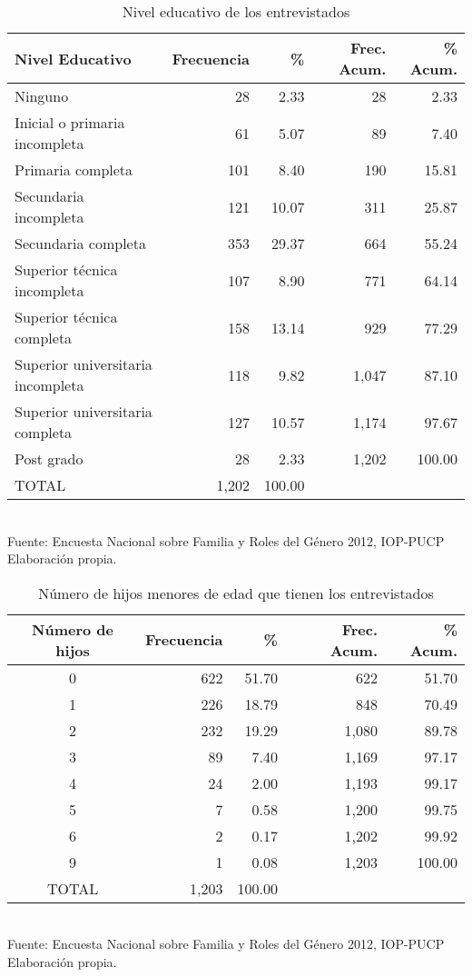\documentclass{article}
\begin{document}
\begin{table}[htbp]
\caption{Nivel educativo de los entrevistados}
\label{tab:nivedu}
\begin{center}
\begin{tabular}{lrrrr}
  \hline
Nivel Educativo & Frecuencia & \% & Frec. Acum. & \% Acum. \\ 
  \hline
Ninguno &  28 & 2.33 &  28 & 2.33 \\ 
  Inicial o primaria incompleta &  61 & 5.07 &  89 & 7.40 \\ 
  Primaria completa & 101 & 8.40 & 190 & 15.81 \\ 
  Secundaria incompleta & 121 & 10.07 & 311 & 25.87 \\ 
  Secundaria completa & 353 & 29.37 & 664 & 55.24 \\ 
  Superior técnica incompleta & 107 & 8.90 & 771 & 64.14 \\ 
  Superior técnica completa & 158 & 13.14 & 929 & 77.29 \\ 
  Superior universitaria incompleta & 118 & 9.82 & 1,047 & 87.10 \\ 
  Superior universitaria completa & 127 & 10.57 & 1,174 & 97.67 \\ 
  Post grado &  28 & 2.33 & 1,202 & 100.00 \\ 
   \hline
   TOTAL & 1,202 & 100.00 & & \\
   \hline
\end{tabular}
\\Fuente: Encuesta Nacional sobre Familia y Roles del Género 2012, IOP-PUCP
\\Elaboración propia.
\end{center}
\end{table}

\begin{table}[ht]
\begin{center}
\caption{Número de hijos menores de edad que tienen los entrevistados}
\label{tab:hijos}
\begin{tabular}{crrrr}
  \hline
Número de hijos & Frecuencia & \% & Frec. Acum. & \% Acum. \\ 
  \hline
0 & 622 & 51.70 & 622 & 51.70 \\ 
  1 & 226 & 18.79 & 848 & 70.49 \\ 
  2 & 232 & 19.29 & 1,080 & 89.78 \\ 
  3 &  89 & 7.40 & 1,169 & 97.17 \\ 
  4 &  24 & 2.00 & 1,193 & 99.17 \\ 
  5 &   7 & 0.58 & 1,200 & 99.75 \\ 
  6 &   2 & 0.17 & 1,202 & 99.92 \\ 
  9 &   1 & 0.08 & 1,203 & 100.00 \\ 
   \hline
TOTAL & 1,203 & 100.00 & & \\
\hline
\end{tabular}
\\Fuente: Encuesta Nacional sobre Familia y Roles del Género 2012, IOP-PUCP
\\Elaboración propia.
\end{center}
\end{table}
\end{document}

